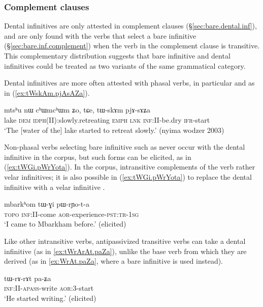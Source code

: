 \subsubsection{Complement clauses} \label{sec:dental.inf.complement}
Dental  infinitives are only attested in complement clauses (§\ref{sec:bare.dental.inf}), and are only found with the verbs that select a bare infinitive (§\ref{sec:bare.inf.complement}) when the verb in the complement clause is transitive. This complementary distribution suggests that bare infinitive and dental infinitives could be treated as two variants of the same grammatical category.

Dental infinitives are more often attested with phasal verbs, in particular  and  as in (\ref{ex:tWskAm.pjAsAZa}).

\begin{exe}
\ex \label{ex:tWskAm.pjAsAZa}
\gll mtsʰu nɯ cʰɯmcʰɯm ʑo, tɕe, tɯ-skɤm pjɤ-sɤʑa \\
lake \textsc{dem} \textsc{idph}(II):slowly.retreating \textsc{emph} \textsc{lnk} \textsc{inf}:II-be.dry \textsc{ifr}-start \\
\glt `The [water of the] lake started to retreat slowly.' (nyima wodzer 2003)
\end{exe}

Non-phasal verbs selecting bare infinitive such as  never occur with the dental infinitive in the corpus, but such forms can be elicited, as in (\ref{ex:tWGi.pWrYota}). In the corpus, intransitive complements of the verb  rather velar infinitives; it is also possible  in (\ref{ex:tWGi.pWrYota}) to replace the dental infinitive  with a velar infinitive .

\begin{exe}
\ex \label{ex:tWGi.pWrYota}
\gll  mbarkʰom tɯ-ɣi pɯ-rɲo-t-a  \\
\textsc{topo} \textsc{inf}:II-come \textsc{aor}-experience-\textsc{pst}:\textsc{tr}-\textsc{1sg} \\
\glt `I came to Mbarkham before.' (elicited)
\end{exe}

Like other intransitive verbs, antipassivized transitive verbs can take a dental infinitive (as in \ref{ex:tWrArAt.paZa}), unlike the base verb from which they are derived (as in \ref{ex:WrAt.paZa}, where a bare infinitive is used instead).

\begin{exe}
\ex \label{ex:tWrArAt.paZa}
\gll tɯ-rɤ-rɤt pa-ʑa \\
\textsc{inf}:II-\textsc{apass}-write \textsc{aor}:3\flobv{}-start \\
\glt `He started writing.' (elicited)
\end{exe}

